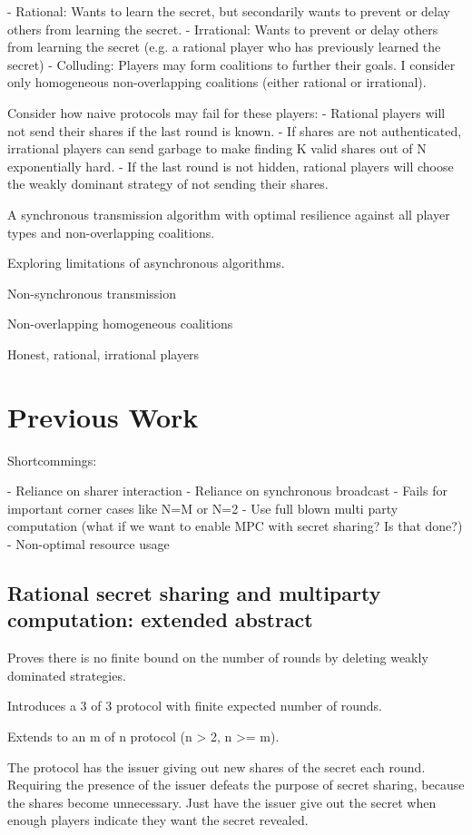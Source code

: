 \documentclass{article}
\begin{document}
- Rational: Wants to learn the secret, but secondarily wants to prevent or delay others from learning the secret.
- Irrational: Wants to prevent or delay others from learning the secret (e.g. a rational player who has previously learned the secret)
- Colluding: Players may form coalitions to further their goals. I consider only homogeneous non-overlapping coalitions (either rational or irrational).

Consider how naive protocols may fail for these players:
- Rational players will not send their shares if the last round is known.
- If shares are not authenticated, irrational players can send garbage to make finding K valid shares out of N exponentially hard.
- If the last round is not hidden, rational players will choose the weakly dominant strategy of not sending their shares.

A synchronous transmission algorithm with optimal resilience against all player types and non-overlapping coalitions.

Exploring limitations of asynchronous algorithms.

Non-synchronous transmission

Non-overlapping homogeneous coalitions

Honest, rational, irrational players

\section{Previous Work}

Shortcommings:

- Reliance on sharer interaction
- Reliance on synchronous broadcast
- Fails for important corner cases like N=M or N=2
- Use full blown multi party computation (what if we want to enable MPC with secret sharing? Is that done?)
- Non-optimal resource usage


\subsection{Rational secret sharing and multiparty computation: extended abstract}
Proves there is no finite bound on the number of rounds by deleting weakly dominated strategies.

Introduces a 3 of 3 protocol with finite expected number of rounds.

Extends to an m of n protocol (n > 2, n >= m).

The protocol has the issuer giving out new shares of the secret each round. Requiring the presence of the issuer defeats the purpose of secret sharing, because the shares become unnecessary. Just have the issuer give out the secret when enough players indicate they want the secret revealed.
\end{document}
